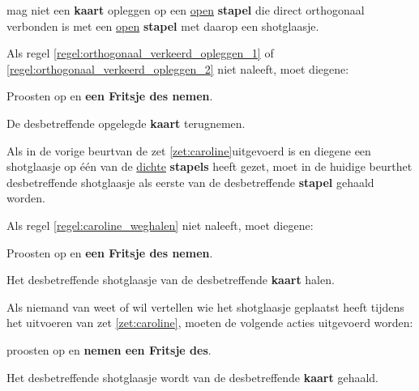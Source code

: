 \vervolgLijst{}
\item \EenSpeler mag niet een \textbf{kaart} opleggen op een \ul{open} \textbf{stapel} die direct orthogonaal\footnotemark[4] \\verbonden is met een \ul{open} \textbf{stapel} met daarop een shotglaasje.
\label{regel:orthogonaal_verkeerd_opleggen_2}
\eindLijst{}

\vervolgLijst{}
\item Als \eenSpeler regel \ref{regel:orthogonaal_verkeerd_opleggen_1} of \ref{regel:orthogonaal_verkeerd_opleggen_2} niet naleeft, moet diegene:
\puntLijst{}
\item Proosten op  en \textbf{een Fritsje des nemen}\footnotemark[3].
\item De desbetreffende opgelegde \textbf{kaart} terugnemen.
\eindPuntLijst{}
\label{regel:kaarten_terugnemen_7}
\eindLijst{}


\vervolgLijst{}
\item \label{regel:caroline_weghalen} Als in de vorige beurt\footnotemark[4] van de \huidigeSpeler zet \ref{zet:caroline}\footnotemark[1] uitgevoerd is en diegene een shotglaasje op \'e\'en van de \ul{dichte} \textbf{stapels} heeft gezet, moet in de huidige beurt\footnotemark[4] het desbetreffende shotglaasje als eerste van de desbetreffende \textbf{stapel} gehaald worden.
\eindLijst{}

\vervolgLijst{}
\item Als \eenSpeler regel \ref{regel:caroline_weghalen} niet naleeft, moet diegene:
\puntLijst{}
\item Proosten op  en \textbf{een Fritsje des nemen}\footnotemark[3].
\item Het desbetreffende shotglaasje van de desbetreffende \textbf{kaart} halen.
\eindPuntLijst{}
\eindLijst{}

\vervolgLijst{}
\item Als niemand van \alleSpelers weet of wil vertellen wie het shotglaasje geplaatst heeft tijdens het uitvoeren van zet \ref{zet:caroline}\footnotemark[1], moeten de volgende acties uitgevoerd worden:
\puntLijst{}
\item \AlleSpelers proosten op  en \textbf{nemen een Fritsje des}\footnotemark[3].
\item Het desbetreffende shotglaasje wordt van de desbetreffende \textbf{kaart} gehaald.
\eindPuntLijst{}
\eindLijst{}

